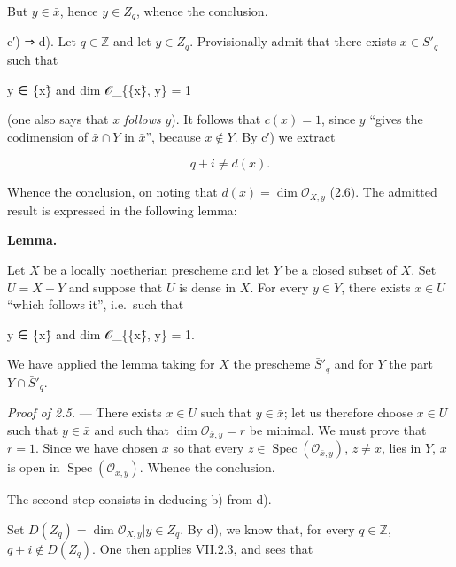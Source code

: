 \documentclass[
]{article}
\newenvironment{Shaded}{}{}
\newcommand{\NormalTok}[1]{#1}
\begin{document}
But \(y \in \bar{x}\), hence \(y \in Z_{q}\), whence the conclusion.

c′) ⇒ d). Let \(q \in \mathbb{Z}\) and let \(y \in Z_{q}\).
Provisionally admit that there exists \(x \in S'_{q}\) such that

\begin{Shaded}
\begin{Highlighting}[]
\NormalTok{y ∈ \{x\}̄    and    dim 𝒪\_\{\{x\}̄, y\} = 1}
\end{Highlighting}
\end{Shaded}

(one also says that \(x\) \emph{follows} \(y\)). It follows that
\(c(x) = 1\), since \(y\) ``gives the codimension of \(\bar{x} \cap Y\)
in \(\bar{x}\)'', because \(x \notin Y\). By c′) we extract

\[
q + i \neq d(x).
\]

Whence the conclusion, on noting that \(d(x) = \dim \mathcal{O}_{X, y}\)
(2.6). The admitted result is expressed in the following lemma:

\textbf{Lemma.}

Let \(X\) be a locally noetherian prescheme and let \(Y\) be a closed
subset of \(X\). Set \(U = X - Y\) and suppose that \(U\) is dense in
\(X\). For every \(y \in Y\), there exists \(x \in U\) ``which follows
it'', i.e.~such that

\begin{Shaded}
\begin{Highlighting}[]
\NormalTok{y ∈ \{x\}̄    and    dim 𝒪\_\{\{x\}̄, y\} = 1.}
\end{Highlighting}
\end{Shaded}

We have applied the lemma taking for \(X\) the prescheme
\(\bar{S}'_{q}\) and for \(Y\) the part \(Y \cap \bar{S}'_{q}\).

\emph{Proof of 2.5.} --- There exists \(x \in U\) such that
\(y \in \bar{x}\); let us therefore choose \(x \in U\) such that
\(y \in \bar{x}\) and such that \(\dim \mathcal{O}_{\bar{x}, y} = r\) be
minimal. We must prove that \(r = 1\). Since we have chosen \(x\) so
that every \(z \in \operatorname{Spec}(\mathcal{O}_{\bar{x}, y})\),
\(z \neq x\), lies in \(Y\), \({x}\) is open in
\(\operatorname{Spec}(\mathcal{O}_{\bar{x}, y})\). Whence the
conclusion.

The second step consists in deducing b) from d).

Set \(D(Z_{q}) = {\dim \mathcal{O}_{X,y} | y \in Z_{q}}\). By d), we
know that, for every \(q \in \mathbb{Z}\), \(q + i \notin D(Z_{q})\).
One then applies VII.2.3, and sees that
\end{document}
